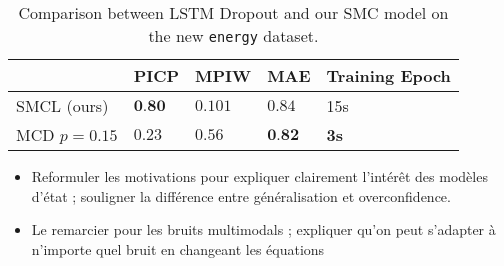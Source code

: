 \documentclass{article}
\begin{document}
\begin{table}[htpb]
	\centering
	\caption{Comparison between LSTM Dropout and our SMC model on the new \texttt{energy} dataset.}
	\label{tab:comparison}
	\begin{tabular}{lllll}
		\toprule
		             & PICP            & MPIW    & MAE             & Training Epoch \\
		\toprule
		SMCL (ours)  & $\textbf{0.80}$ & $0.101$ & $0.84$          & 15s            \\
		MCD $p=0.15$ & $0.23$          & $0.56$  & $\textbf{0.82}$ & \textbf{3s}    \\
		\bottomrule
	\end{tabular}
\end{table}

\begin{itemize}
	\item Reformuler les motivations pour expliquer clairement l'intérêt des modèles d'état ; souligner la différence entre généralisation et overconfidence.
	\item Le remarcier pour les bruits multimodals ; expliquer qu'on peut s'adapter à n'importe quel bruit en changeant les équations
\end{itemize}



\end{document}
